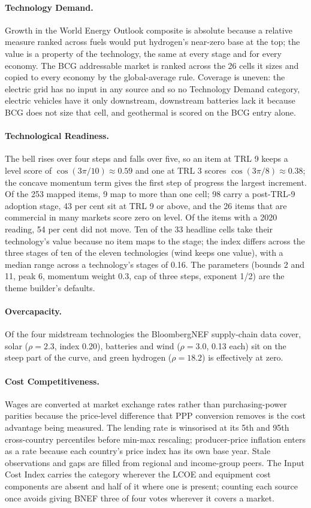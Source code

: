 \paragraph{Technology Demand.} Growth in the World Energy Outlook composite is absolute because a
relative measure ranked across fuels would put hydrogen's near-zero base at the top; the value is a
property of the technology, the same at every stage and for every economy. The BCG addressable
market is ranked across the 26 cells it sizes and copied to every economy by the global-average
rule. Coverage is uneven: the electric grid has no input in any source and so no Technology Demand
category, electric vehicles have it only downstream, downstream batteries lack it because BCG does
not size that cell, and geothermal is scored on the BCG entry alone.

\paragraph{Technological Readiness.} The bell rises over four steps and falls over five, so an
item at TRL 9 keeps a level score of $\cos(3\pi/10)\approx0.59$ and one at TRL 3 scores
$\cos(3\pi/8)\approx0.38$; the concave momentum term gives the first step of progress the largest
increment. Of the 253 mapped items, 9 map to more than one cell; 98 carry a post-TRL-9 adoption
stage, 43 per cent sit at TRL 9 or above, and the 26 items that are commercial in many markets score
zero on level. Of the items with a 2020 reading, 54 per cent did not move. Ten of the 33 headline
cells take their technology's value because no item maps to the stage; the index differs across the
three stages of ten of the eleven technologies (wind keeps one value), with a median range across a
technology's stages of 0.16. The parameters (bounds 2 and 11, peak 6, momentum weight 0.3, cap of
three steps, exponent 1/2) are the theme builder's defaults.

\paragraph{Overcapacity.} Of the four midstream technologies the BloombergNEF supply-chain data
cover, solar ($\rho=2.3$, index 0.20), batteries and wind ($\rho=3.0$, 0.13 each) sit on the steep
part of the curve, and green hydrogen ($\rho=18.2$) is effectively at zero.

\paragraph{Cost Competitiveness.} Wages are converted at market exchange rates rather than
purchasing-power parities because the price-level difference that PPP conversion removes is the
cost advantage being measured. The lending rate is winsorised at its 5th and 95th cross-country
percentiles before min-max rescaling; producer-price inflation enters as a rate because each
country's price index has its own base year. Stale observations and gaps are filled from regional
and income-group peers. The Input Cost Index carries the category wherever the LCOE and equipment
cost components are absent and half of it where one is present; counting each source once avoids
giving BNEF three of four votes wherever it covers a market.

